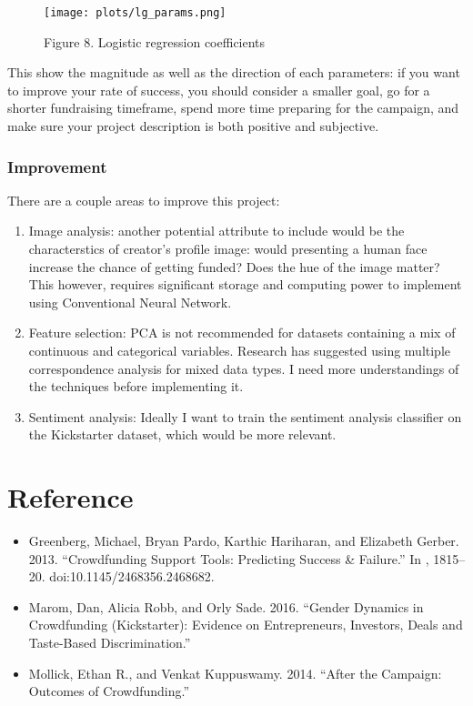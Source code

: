 \documentclass[11pt]{article}
\providecommand{\tightlist}{%
      \setlength{\itemsep}{0pt}\setlength{\parskip}{0pt}}
\begin{document}
\begin{figure}
\centering
\texttt{[image: plots/lg\_params.png]}
\caption{Figure 8. Logistic regression coefficients}
\end{figure}

This show the magnitude as well as the direction of each parameters: if
you want to improve your rate of success, you should consider a smaller
goal, go for a shorter fundraising timeframe, spend more time preparing
for the campaign, and make sure your project description is both
positive and subjective.

\subsubsection{Improvement}\label{improvement}

There are a couple areas to improve this project:

\begin{enumerate}
\def\labelenumi{\arabic{enumi}.}
\item
  Image analysis: another potential attribute to include would be the
  characterstics of creator's profile image: would presenting a human
  face increase the chance of getting funded? Does the hue of the image
  matter? This however, requires significant storage and computing power
  to implement using Conventional Neural Network.
\item
  Feature selection: PCA is not recommended for datasets containing a
  mix of continuous and categorical variables. Research has suggested
  using multiple correspondence analysis for mixed data types. I need
  more understandings of the techniques before implementing it.
\item
  Sentiment analysis: Ideally I want to train the sentiment analysis
  classifier on the Kickstarter dataset, which would be more relevant.
\end{enumerate}

\section{Reference}\label{reference}

\begin{itemize}
\tightlist
\item
  Greenberg, Michael, Bryan Pardo, Karthic Hariharan, and Elizabeth
  Gerber. 2013. ``Crowdfunding Support Tools: Predicting Success \&
  Failure.'' In , 1815--20. doi:10.1145/2468356.2468682.
\item
  Marom, Dan, Alicia Robb, and Orly Sade. 2016. ``Gender Dynamics in
  Crowdfunding (Kickstarter): Evidence on Entrepreneurs, Investors,
  Deals and Taste-Based Discrimination.''
\item
  Mollick, Ethan R., and Venkat Kuppuswamy. 2014. ``After the Campaign:
  Outcomes of Crowdfunding.''
\end{itemize}


    
    
    
    
\end{document}
